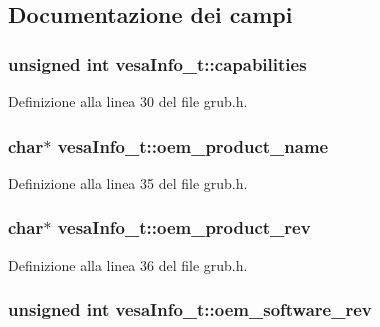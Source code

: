\subsection{Documentazione dei campi}
\hypertarget{structvesaInfo__t_a1f4453c48c6629e27fd2e97948deb62b}{
\subsubsection[{capabilities}]{\setlength{\rightskip}{0pt plus 5cm}unsigned int vesa\+Info\+\_\+t\+::capabilities}}\label{structvesaInfo__t_a1f4453c48c6629e27fd2e97948deb62b}


Definizione alla linea 30 del file grub.\+h.

\hypertarget{structvesaInfo__t_a532306633838e6bc58a9e91f69835302}{
\subsubsection[{oem\+\_\+product\+\_\+name}]{\setlength{\rightskip}{0pt plus 5cm}char$\ast$ vesa\+Info\+\_\+t\+::oem\+\_\+product\+\_\+name}}\label{structvesaInfo__t_a532306633838e6bc58a9e91f69835302}


Definizione alla linea 35 del file grub.\+h.

\hypertarget{structvesaInfo__t_a4df6ee9c56e2171999b8346550e2273f}{
\subsubsection[{oem\+\_\+product\+\_\+rev}]{\setlength{\rightskip}{0pt plus 5cm}char$\ast$ vesa\+Info\+\_\+t\+::oem\+\_\+product\+\_\+rev}}\label{structvesaInfo__t_a4df6ee9c56e2171999b8346550e2273f}


Definizione alla linea 36 del file grub.\+h.

\hypertarget{structvesaInfo__t_af0e5f50889726f62d961141ee8fa06f3}{
\subsubsection[{oem\+\_\+software\+\_\+rev}]{\setlength{\rightskip}{0pt plus 5cm}unsigned int vesa\+Info\+\_\+t\+::oem\+\_\+software\+\_\+rev}}\label{structvesaInfo__t_af0e5f50889726f62d961141ee8fa06f3}


